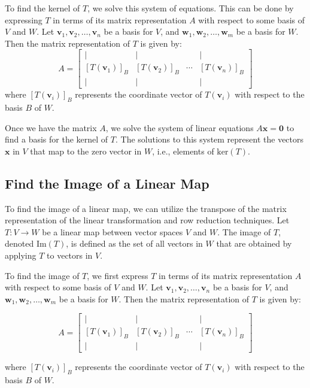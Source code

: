 To find the kernel of $T$, we solve this system of equations. This can be done by expressing $T$ in terms of its matrix representation $A$ with respect to some basis of $V$ and $W$. Let $\mathbf{v}_1, \mathbf{v}_2, \ldots, \mathbf{v}_n$ be a basis for $V$, and $\mathbf{w}_1, \mathbf{w}_2, \ldots, \mathbf{w}_m$ be a basis for $W$. Then the matrix representation of $T$ is given by:
\[
A = \begin{bmatrix}
| & | & & | \\
[T(\mathbf{v}_1)]_B & [T(\mathbf{v}_2)]_B & \cdots & [T(\mathbf{v}_n)]_B \\
| & | & & |
\end{bmatrix}
\]
where $[T(\mathbf{v}_i)]_B$ represents the coordinate vector of $T(\mathbf{v}_i)$ with respect to the basis $B$ of $W$.

Once we have the matrix $A$, we solve the system of linear equations $A\mathbf{x} = \mathbf{0}$ to find a basis for the kernel of $T$. The solutions to this system represent the vectors $\mathbf{x}$ in $V$ that map to the zero vector in $W$, i.e., elements of $\text{ker}(T)$.

\subsection{Find the Image of a Linear Map}

To find the image of a linear map, we can utilize the transpose of the matrix representation of the linear transformation and row reduction techniques. Let $T: V \rightarrow W$ be a linear map between vector spaces $V$ and $W$. The image of $T$, denoted $\text{Im}(T)$, is defined as the set of all vectors in $W$ that are obtained by applying $T$ to vectors in $V$.

To find the image of $T$, we first express $T$ in terms of its matrix representation $A$ with respect to some basis of $V$ and $W$. Let $\mathbf{v}_1, \mathbf{v}_2, \ldots, \mathbf{v}_n$ be a basis for $V$, and $\mathbf{w}_1, \mathbf{w}_2, \ldots, \mathbf{w}_m$ be a basis for $W$. Then the matrix representation of $T$ is given by:

\[
A = \begin{bmatrix}
| & | & & | \\
[T(\mathbf{v}_1)]_B & [T(\mathbf{v}_2)]_B & \cdots & [T(\mathbf{v}_n)]_B \\
| & | & & |
\end{bmatrix}
\]

where $[T(\mathbf{v}_i)]_B$ represents the coordinate vector of $T(\mathbf{v}_i)$ with respect to the basis $B$ of $W$.
\\


